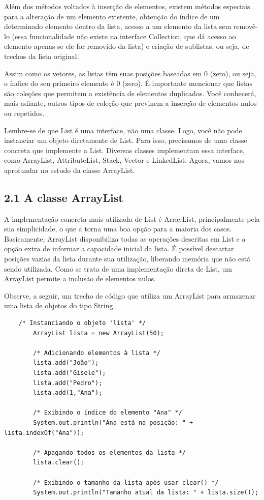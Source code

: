 \documentclass[11pt]{article}
\begin{document}
Além dos métodos voltados à inserção de elementos, existem métodos especiais para a alteração de um elemento existente, obtenção do índice de um determinado elemento dentro da lista, acesso a um elemento da lista sem removê-lo (essa funcionalidade não existe na interface Collection, que dá acesso ao elemento apenas se ele for removido da lista) e criação de sublistas, ou seja, de trechos da lista original.

Assim como os vetores, as listas têm suas posições baseadas em 0 (zero), ou seja, o índice do seu primeiro elemento é 0 (zero). É importante mencionar que listas são coleções que permitem a existência de elementos duplicados. Você conhecerá, mais adiante, outros tipos de coleção que previnem a inserção de elementos nulos ou repetidos.

Lembre-se de que List é uma interface, não uma classe. Logo, você não pode instanciar um objeto diretamente de List. Para isso, precisamos de uma classe concreta que implemente a List. Diversas classes implementam essa interface, como ArrayList, AttributeList, Stack, Vector e LinkedList. Agora, vamos nos aprofundar no estudo da classe ArrayList.

\subsection{2.1 A classe ArrayList}
\label{sec:orgf1e13b7}
A implementação concreta mais utilizada de List é ArrayList, principalmente pela sua simplicidade, o que a torna uma boa opção para a maioria dos casos. Basicamente, ArrayList disponibiliza todas as operações descritas em List e a opção extra de informar a capacidade inicial da lista. É possível descartar posições vazias da lista durante sua utilização, liberando memória que não está sendo utilizada. Como se trata de uma implementação direta de List, um ArrayList permite a inclusão de elementos nulos.

Observe, a seguir, um trecho de código que utiliza um ArrayList para armazenar uma lista de objetos do tipo String.

\begin{verbatim}
    /* Instanciando o objeto 'lista' */
        ArrayList lista = new ArrayList(50);

        /* Adicionando elementos à lista */
        lista.add("João");
        lista.add("Gisele");
        lista.add("Pedro");
        lista.add(1,"Ana");

        /* Exibindo o índice do elemento "Ana" */
        System.out.println("Ana está na posição: " + lista.indexOf("Ana"));

        /* Apagando todos os elementos da lista */
        lista.clear();

        /* Exibindo o tamanho da lista após usar clear() */
        System.out.println("Tamanho atual da lista: " + lista.size());
\end{verbatim}
\end{document}
